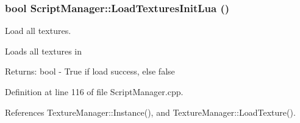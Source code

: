 \hypertarget{class_script_manager_ad8b6e301a1718048869040f83689ec1}{
\subsubsection[LoadTexturesInitLua]{\setlength{\rightskip}{0pt plus 5cm}bool ScriptManager::LoadTexturesInitLua ()}}
\label{class_script_manager_ad8b6e301a1718048869040f83689ec1}


Load all textures. 

Loads all textures in

\begin{Desc}
\item[Returns:]bool - True if load success, else false \end{Desc}


Definition at line 116 of file ScriptManager.cpp.

References TextureManager::Instance(), and TextureManager::LoadTexture().

